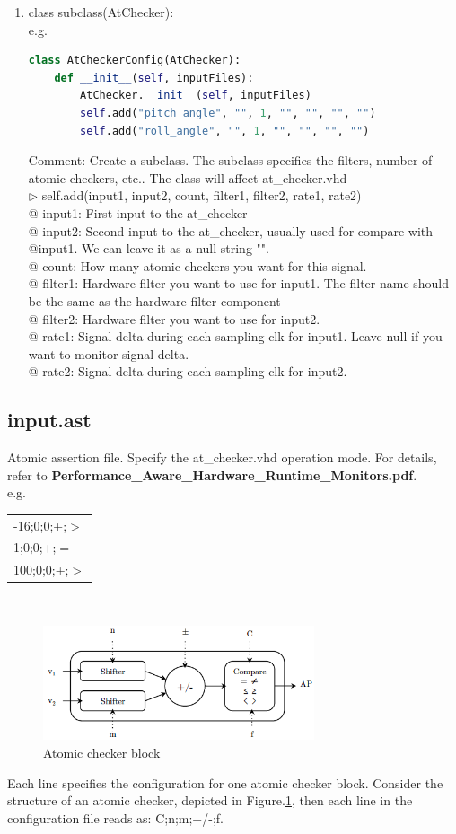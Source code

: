\documentclass{article}
\theoremstyle{definition}
\begin{document}
\begin{enumerate}
\item class subclass(AtChecker):\\
e.g.
\begin{lstlisting}[language=Python]
class AtCheckerConfig(AtChecker):
	def __init__(self, inputFiles):
		AtChecker.__init__(self, inputFiles)
		self.add("pitch_angle", "", 1, "", "", "", "")
		self.add("roll_angle", "", 1, "", "", "", "")
\end{lstlisting}
Comment: Create a subclass. The subclass specifies the filters, number of atomic checkers, etc.. The class will affect at\_checker.vhd\\
$\triangleright$ self.add(input1, input2, count, filter1, filter2, rate1, rate2)\\
@ input1: First input to the at\_checker\\
@ input2: Second input to the at\_checker, usually used for compare with @input1. We can leave it as a null string "".\\
@ count: How many atomic checkers you want for this signal.\\
@ filter1: Hardware filter you want to use for input1. The filter name should be the same as the hardware filter component\\
@ filter2: Hardware filter you want to use for input2.\\
@ rate1: Signal delta during each sampling clk for input1. Leave null if you want to monitor signal delta.\\
@ rate2: Signal delta during each sampling clk for input2.

\end{enumerate}


\subsection{input.ast}\label{input.ast}
Atomic assertion file. Specify the at\_checker.vhd operation mode. For details, refer to \textbf{Performance\_Aware\_Hardware\_Runtime\_Monitors.pdf}.
\\
e.g.\\
\begin{tabular}{|p{}|}
\hline
-16;0;0;+;$>$\\
1;0;0;+;$=$\\
100;0;0;+;$>$\\
\hline
\end{tabular}
\\
\begin{figure}[h]
\caption{Atomic checker block}
\label{ac}
\includegraphics[width=8cm]{./fig/ast.png}
\centering
\end{figure}
Each line specifies the configuration for one atomic checker block. Consider the structure
of an atomic checker, depicted in Figure.\ref{ac}, then each line in the configuration file reads as:
C;n;m;+/-;f.
\end{document}
